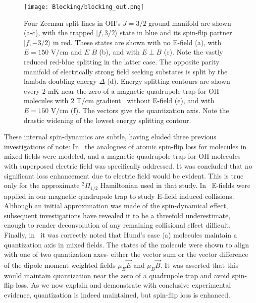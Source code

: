 \documentclass[%
 reprint,
groupedaddress,
 amsmath,amssymb,
 aps,
prl,
]{revtex4-1}
\newcommand{\epb}{{$E\!\perp\!B$}}
\begin{document}

\begin{figure}[tb]
\texttt{[image: Blocking/blocking\_out.png]}%
\caption{
Four Zeeman split lines in OH's $J=3/2$ ground manifold are shown (a-c), with the trapped $|f,3/2\rangle$ state in blue and its spin-flip partner $|f,-3/2\rangle$ in red. These states are shown with no E-field (a), with $E=150\text{ V/cm}$ and $E\,$\raisebox{0.5px}{$\parallel$}$\,B$ (b), and with \epb{} (c). Note the vastly reduced red-blue splitting in the latter case. The opposite parity manifold of electrically strong field seeking substates is split by the lambda doubling energy $\Delta$ (d). Energy splitting contours are shown every $2\text{ mK}$ near the zero of a magnetic quadrupole trap for OH molecules with $2\text{ T/cm}$ gradient~\cite{Stuhl2012uwave} without E-field (e), and with $E=150\text{ V/cm}$ (f). The vectors give the quantization axis. Note the drastic widening of the lowest energy splitting contour.
\label{fig:blocking}}
\end{figure}


These internal spin-dynamics are subtle, having eluded three previous investigations of note: In~\cite{Lara2008} the analogues of atomic spin-flip loss for molecules in mixed fields were modeled, and a magnetic quadrupole trap for OH molecules with superposed electric field was specifically addressed. It was concluded that no significant loss enhancement due to electric field would be evident. This is true only for the approximate $^2\Pi_{1/2}$ Hamiltonian used in that study. In~\cite{Stuhl2013} E-fields were applied in our magnetic quadrupole trap to study E-field induced collisions. Although an initial approximation was made of the spin-dynamical effect, subsequent investigations have revealed it to be a threefold underestimate, enough to render deconvolution of any remaining collisional effect difficult. Finally, in~\cite{Bohn2013} it was correctly noted that Hund's case (a) molecules maintain a quantization axis in mixed fields. The states of the molecule were shown to align with one of two quantization axes- either the vector sum or the vector difference of the dipole moment weighted fields $\mu_E\vec{E}$ and $\mu_B\vec{B}$. It was asserted that this would maintain quantization near the zero of a quadrupole trap and avoid spin-flip loss. As we now explain and demonstrate with conclusive experimental evidence, quantization is indeed maintained, but spin-flip loss is enhanced.
\end{document}
